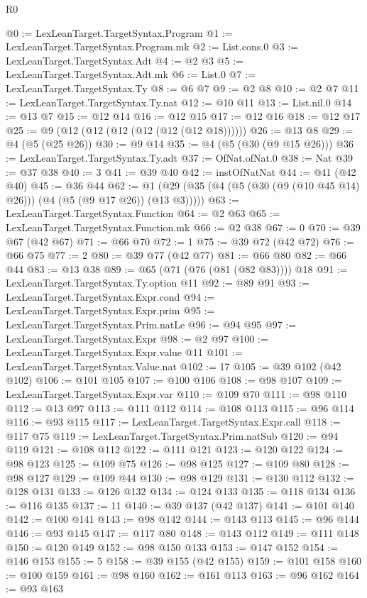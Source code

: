 \begin{lexlean}{R0}
\begin{coremodule}
@0 := LexLeanTarget.TargetSyntax.Program
@1 := LexLeanTarget.TargetSyntax.Program.mk
@2 := List.cons.{0}
@3 := LexLeanTarget.TargetSyntax.Adt
@4 := @2 @3
@5 := LexLeanTarget.TargetSyntax.Adt.mk
@6 := List.{0}
@7 := LexLeanTarget.TargetSyntax.Ty
@8 := @6 @7
@9 := @2 @8
@10 := @2 @7
@11 := LexLeanTarget.TargetSyntax.Ty.nat
@12 := @10 @11
@13 := List.nil.{0}
@14 := @13 @7
@15 := @12 @14
@16 := @12 @15
@17 := @12 @16
@18 := @12 @17
@25 := @9 (@12 (@12 (@12 (@12 (@12 (@12 @18))))))
@26 := @13 @8
@29 := @4 (@5 (@25 @26))
@30 := @9 @14
@35 := @4 (@5 (@30 (@9 @15 @26)))
@36 := LexLeanTarget.TargetSyntax.Ty.adt
@37 := OfNat.ofNat.{0}
@38 := Nat
@39 := @37 @38
@40 := 3
@41 := @39 @40
@42 := instOfNatNat
@44 := @41 (@42 @40)
@45 := @36 @44
@62 := @1 (@29 (@35 (@4 (@5 (@30 (@9 (@10 @45 @14) @26))) (@4 (@5 (@9 @17 @26)) (@13 @3)))))
@63 := LexLeanTarget.TargetSyntax.Function
@64 := @2 @63
@65 := LexLeanTarget.TargetSyntax.Function.mk
@66 := @2 @38
@67 := 0
@70 := @39 @67 (@42 @67)
@71 := @66 @70
@72 := 1
@75 := @39 @72 (@42 @72)
@76 := @66 @75
@77 := 2
@80 := @39 @77 (@42 @77)
@81 := @66 @80
@82 := @66 @44
@83 := @13 @38
@89 := @65 (@71 (@76 (@81 (@82 @83)))) @18
@91 := LexLeanTarget.TargetSyntax.Ty.option @11
@92 := @89 @91
@93 := LexLeanTarget.TargetSyntax.Expr.cond
@94 := LexLeanTarget.TargetSyntax.Expr.prim
@95 := LexLeanTarget.TargetSyntax.Prim.natLe
@96 := @94 @95
@97 := LexLeanTarget.TargetSyntax.Expr
@98 := @2 @97
@100 := LexLeanTarget.TargetSyntax.Expr.value @11
@101 := LexLeanTarget.TargetSyntax.Value.nat
@102 := 17
@105 := @39 @102 (@42 @102)
@106 := @101 @105
@107 := @100 @106
@108 := @98 @107
@109 := LexLeanTarget.TargetSyntax.Expr.var
@110 := @109 @70
@111 := @98 @110
@112 := @13 @97
@113 := @111 @112
@114 := @108 @113
@115 := @96 @114
@116 := @93 @115
@117 := LexLeanTarget.TargetSyntax.Expr.call
@118 := @117 @75
@119 := LexLeanTarget.TargetSyntax.Prim.natSub
@120 := @94 @119
@121 := @108 @112
@122 := @111 @121
@123 := @120 @122
@124 := @98 @123
@125 := @109 @75
@126 := @98 @125
@127 := @109 @80
@128 := @98 @127
@129 := @109 @44
@130 := @98 @129
@131 := @130 @112
@132 := @128 @131
@133 := @126 @132
@134 := @124 @133
@135 := @118 @134
@136 := @116 @135
@137 := 11
@140 := @39 @137 (@42 @137)
@141 := @101 @140
@142 := @100 @141
@143 := @98 @142
@144 := @143 @113
@145 := @96 @144
@146 := @93 @145
@147 := @117 @80
@148 := @143 @112
@149 := @111 @148
@150 := @120 @149
@152 := @98 @150 @133
@153 := @147 @152
@154 := @146 @153
@155 := 5
@158 := @39 @155 (@42 @155)
@159 := @101 @158
@160 := @100 @159
@161 := @98 @160
@162 := @161 @113
@163 := @96 @162
@164 := @93 @163

\end{coremodule}
\end{lexlean}
